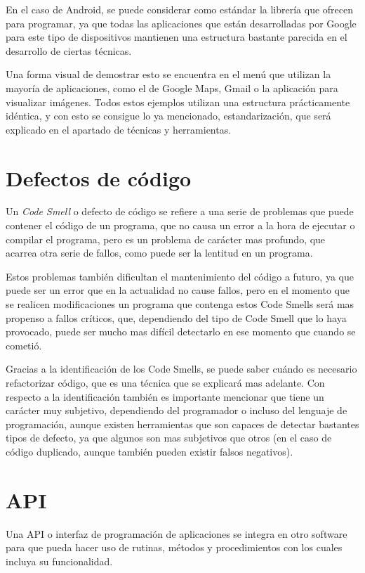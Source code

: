 En el caso de Android, se puede considerar como estándar la librería que ofrecen para programar, ya que todas las aplicaciones que están desarrolladas por Google para este tipo de dispositivos mantienen una estructura bastante parecida en el desarrollo de ciertas técnicas.

Una forma visual de demostrar esto se encuentra en el menú que utilizan la mayoría de aplicaciones, como el de Google Maps, Gmail o la aplicación para visualizar imágenes. Todos estos ejemplos utilizan una estructura prácticamente idéntica, y con esto se consigue lo ya mencionado, estandarización, que será explicado en el apartado de técnicas y herramientas.

\section{Defectos de código}

Un \textit{Code Smell} o defecto de código \cite{refac2} se refiere a una serie de problemas que puede contener el código de un programa, que no causa un error a la hora de ejecutar o compilar el programa, pero es un problema de carácter mas profundo, que acarrea otra serie de fallos, como puede ser la lentitud en un programa.

Estos problemas también dificultan el mantenimiento del código a futuro, ya que puede ser un error que en la actualidad no cause fallos, pero en el momento que se realicen modificaciones un programa que contenga estos Code Smells será mas propenso a fallos críticos, que, dependiendo del tipo de Code Smell que lo haya provocado, puede ser mucho mas difícil detectarlo en ese momento que cuando se cometió.

Gracias a la identificación de los Code Smells, se puede saber cuándo es necesario refactorizar código, que es una técnica que se explicará mas adelante. Con respecto a la identificación también es importante mencionar que tiene un carácter muy subjetivo, dependiendo del programador o incluso del lenguaje de programación, aunque existen herramientas que son capaces de detectar bastantes tipos de defecto, ya que algunos son mas subjetivos que otros (en el caso de código duplicado, aunque también pueden existir falsos negativos).

\section{API}

Una API \cite{api1} o interfaz de programación de aplicaciones \cite{api2} se integra en otro software para que pueda hacer uso de rutinas, métodos y procedimientos con los cuales incluya su funcionalidad.

